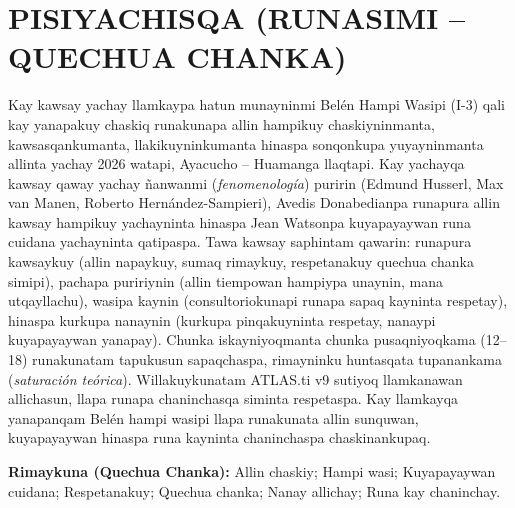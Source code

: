 \section*{PISIYACHISQA (RUNASIMI -- QUECHUA CHANKA)}

\noindent Kay kawsay yachay llamkaypa hatun munayninmi Belén Hampi Wasipi (I-3) qali kay yanapakuy chaskiq runakunapa allin hampikuy chaskiyninmanta, kawsasqankumanta, llakikuyninkumanta hinaspa sonqonkupa yuyayninmanta allinta yachay 2026 watapi, Ayacucho -- Huamanga llaqtapi. Kay yachayqa kawsay qaway yachay ñanwanmi (\textit{fenomenología}) puririn (Edmund Husserl, Max van Manen, Roberto Hernández-Sampieri), Avedis Donabedianpa runapura allin kawsay hampikuy yachayninta hinaspa Jean Watsonpa kuyapayaywan runa cuidana yachayninta qatipaspa. Tawa kawsay saphintam qawarin: runapura kawsaykuy (allin napaykuy, sumaq rimaykuy, respetanakuy quechua chanka simipi), pachapa puririynin (allin tiempowan hampiypa unaynin, mana utqayllachu), wasipa kaynin (consultoriokunapi runapa sapaq kayninta respetay), hinaspa kurkupa nanaynin (kurkupa pinqakuyninta respetay, nanaypi kuyapayaywan yanapay). Chunka iskayniyoqmanta chunka pusaqniyoqkama (12--18) runakunatam tapukusun sapaqchaspa, rimayninku huntasqata tupanankama (\textit{saturación teórica}). Willakuykunatam ATLAS.ti v9 sutiyoq llamkanawan allichasun, llapa runapa chaninchasqa siminta respetaspa. Kay llamkayqa yanapanqam Belén hampi wasipi llapa runakunata allin sunquwan, kuyapayaywan hinaspa runa kayninta chaninchaspa chaskinankupaq.

\vspace{0.8cm}
\noindent \textbf{Rimaykuna (Quechua Chanka):} Allin chaskiy; Hampi wasi; Kuyapayaywan cuidana; Respetanakuy; Quechua chanka; Nanay allichay; Runa kay chaninchay.

\newpage
